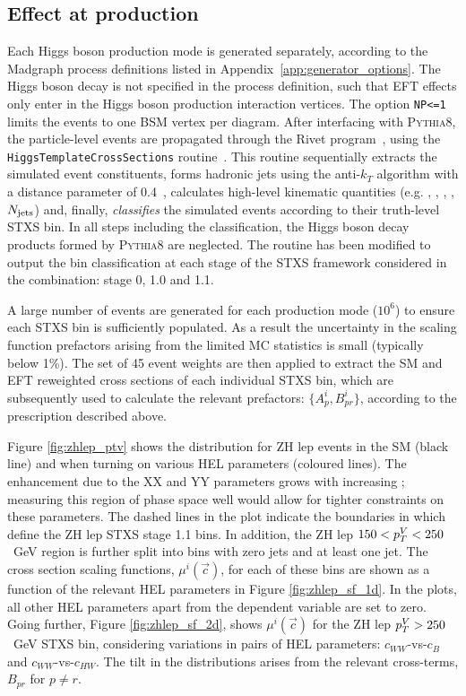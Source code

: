 \subsection{Effect at production}
Each Higgs boson production mode is generated separately, according to the Madgraph process definitions listed in Appendix~\ref{app:generator_options}. The Higgs boson decay is not specified in the process definition, such that EFT effects only enter in the Higgs boson production interaction vertices. The option \texttt{NP<=1} limits the events to one BSM vertex per diagram. After interfacing with \textsc{Pythia8}, the particle-level events are propagated through the Rivet program~\cite{}, using the \texttt{HiggsTemplateCrossSections} routine~\cite{}. This routine sequentially extracts the simulated event constituents, forms hadronic jets using the anti-$k_T$ algorithm with a distance parameter of 0.4~\cite{}, calculates high-level kinematic quantities (e.g. \ptH, \ptV, \ptHjj, \mjj, $N_{\rm{jets}}$) and, finally, \textit{classifies} the simulated events according to their truth-level STXS bin. In all steps including the classification, the Higgs boson decay products formed by \textsc{Pythia8} are neglected. The routine has been modified to output the bin classification at each stage of the STXS framework considered in the combination: stage 0, 1.0 and 1.1.

A large number of events are generated for each production mode ($10^6$) to ensure each STXS bin is sufficiently populated. As a result the uncertainty in the scaling function prefactors arising from the limited MC statistics is small (typically below 1\%). The set of 45 event weights are then applied to extract the SM and EFT reweighted cross sections of each individual STXS bin, which are subsequently used to calculate the relevant prefactors: $\{A^i_p,B^i_{pr}\}$, according to the prescription described above. 

Figure \ref{fig:zhlep_ptv} shows the \ptV distribution for ZH lep events in the SM (black line) and when turning on various HEL parameters (coloured lines). The enhancement due to the XX and YY parameters grows with increasing \ptV; measuring this region of phase space well would allow for tighter constraints on these parameters. The dashed lines in the plot indicate the boundaries in \ptV which define the ZH lep STXS stage 1.1 bins. In addition, the ZH lep $150<p_T^V<250$~GeV region is further split into bins with zero jets and at least one jet. The cross section scaling functions, $\mu^i(\vec{c})$, for each of these bins are shown as a function of the relevant HEL parameters in Figure \ref{fig:zhlep_sf_1d}. In the plots, all other HEL parameters apart from the dependent variable are set to zero. Going further, Figure \ref{fig:zhlep_sf_2d}, shows $\mu^i(\vec{c})$ for the ZH lep $p_T^V>250$~GeV STXS bin, considering variations in pairs of HEL parameters: $c_{WW}$-vs-$c_B$ and $c_{WW}$-vs-$c_{HW}$. The tilt in the distributions arises from the relevant cross-terms, $B_{pr}$ for $p \neq r$.

